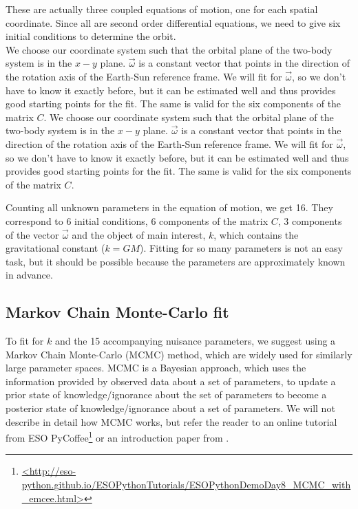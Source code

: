 \documentclass[]{rsos}
\begin{document}
These are actually three coupled equations of motion, one for each spatial coordinate. Since all are second order differential equations, we need to give six initial conditions to determine the orbit.\\
We choose our coordinate system such that the orbital plane of the two-body system is in the $x-y$ plane. $\vec{\omega}$ is a constant vector that points in the direction of the rotation axis of the Earth-Sun reference frame. We will fit for $\vec{\omega}$, so we don't have to know it exactly before, but it can be estimated well and thus provides good starting points for the fit. The same is valid for the six components of the matrix $C$.
We choose our coordinate system such that the orbital plane of the two-body system is in the $x-y$ plane. $\vec{\omega}$ is a constant vector that points in the direction of the rotation axis of the Earth-Sun reference frame. We will fit for $\vec{\omega}$, so we don't have to know it exactly before, but it can be estimated well and thus provides good starting points for the fit. The same is valid for the six components of the matrix $C$.

Counting all unknown parameters in the equation of motion, we get
16. They correspond to 6 initial conditions, 6 components of the
matrix $C$, 3 components of the vector $\vec{\omega}$ and the object
of main interest, $k$, which contains the gravitational constant ($k =
GM$). Fitting for so many parameters is not an easy task, but it
should be possible because the parameters are approximately known in
advance.

\subsection{Markov Chain Monte-Carlo fit}

To fit for $k$ and the 15 accompanying nuisance parameters, we suggest
using a Markov Chain Monte-Carlo (MCMC) method, which are widely used
for similarly large parameter spaces.  MCMC is a Bayesian approach,
which uses the information provided by observed data about a set of
parameters, to update a prior state of knowledge/ignorance about the
set of parameters to become a posterior state of knowledge/ignorance
about a set of parameters. We will not describe in detail how MCMC
works, but refer the reader to an online tutorial from ESO
PyCoffee\footnote{\url{<http://eso-python.github.io/ESOPythonTutorials/ESOPythonDemoDay8_MCMC_with_emcee.html>}}
or an introduction paper from \cite{vanRavenzwaaij16}.
\end{document}

